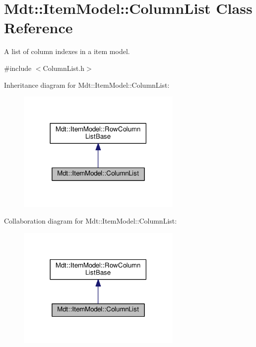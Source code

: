 \hypertarget{class_mdt_1_1_item_model_1_1_column_list}{}\section{Mdt\+:\+:Item\+Model\+:\+:Column\+List Class Reference}
\label{class_mdt_1_1_item_model_1_1_column_list}


A list of column indexes in a item model.  




{\ttfamily \#include $<$Column\+List.\+h$>$}



Inheritance diagram for Mdt\+:\+:Item\+Model\+:\+:Column\+List\+:\nopagebreak
\begin{figure}[H]
\begin{center}
\leavevmode
\includegraphics[width=225pt]{class_mdt_1_1_item_model_1_1_column_list__inherit__graph}
\end{center}
\end{figure}


Collaboration diagram for Mdt\+:\+:Item\+Model\+:\+:Column\+List\+:\nopagebreak
\begin{figure}[H]
\begin{center}
\leavevmode
\includegraphics[width=225pt]{class_mdt_1_1_item_model_1_1_column_list__coll__graph}
\end{center}
\end{figure}
